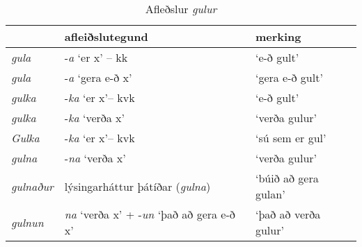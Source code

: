 \documentclass[../samsetningasafn.tex]{subfiles}
\begin{document}
\begin{table}[ht!]%
\begin{footnotesize}
\begin{tcolorbox}
	\begin{center}
	\begin{tabularx}{\textwidth}{Xll}
						&	\textbf{afleiðslutegund}					&	\textbf{merking}	\\
	\hline
	\textit{gula}			&	-\textit{a} \lq er x\rq{} -- kk 				&	\lq e-ð gult\rq	\\
	\textit{gula}			&	-\textit{a} \lq gera e-ð x\rq				&	\lq gera e-ð gult\rq		\\
	\textit{gulka}		&	-\textit{ka} \lq er x\rq -- kvk 				&	\lq e-ð gult\rq	\\
	\textit{gulka}		&	-\textit{ka} \lq verða x\rq					&	\lq verða gulur\rq	\\
	\textit{Gulka}		&	-\textit{ka} \lq er x\rq -- kvk 				&	\lq sú sem er gul\rq	\\
	\textit{gulna}		&	-\textit{na} \lq verða x\rq 				&	\lq verða gulur\rq	\\
	\textit{gulnaður}		&	lýsingarháttur þátíðar (\textit{gulna})		&	\lq búið að gera gulan\rq	\\
	\textit{gulnun}		&	\textit{na} \lq verða x\rq{} + -\textit{un} \lq það að gera e-ð x\rq	&	\lq það að verða gulur\rq	\\
	\end{tabularx}
	\end{center}
\end{tcolorbox}
\end{footnotesize}
	\caption{Afleðslur \textit{gulur}}
	\label{tafla:gafl}
\end{table}

\clearpage
\end{document}
